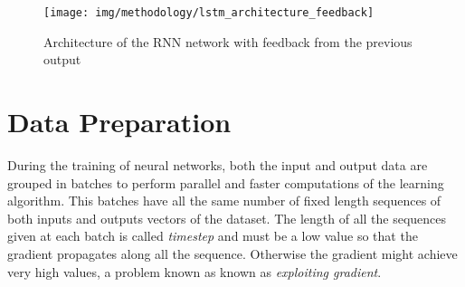 
\begin{figure}[H]
\begin{center}
\texttt{[image: img/methodology/lstm\_architecture\_feedback]}
\end{center}
\caption{Architecture of the RNN network with feedback from the previous output}
\label{fig:lstm_architecture_feedback}
\end{figure}





\section{Data Preparation}

During the training of neural networks, both the input and output data are grouped in batches to perform parallel and faster computations of the learning algorithm. This batches have all the same number of fixed length sequences of both inputs and outputs vectors of the dataset.
The length of all the sequences given at each batch is called \textit{timestep} and must be a low value so that the gradient propagates along all the sequence. Otherwise the gradient might achieve very high values, a problem known as known as \textit{exploiting gradient}.

